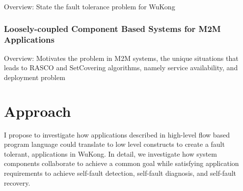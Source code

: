 Overview: State the fault tolerance problem for WuKong

\subsubsection{Loosely-coupled Component Based Systems for M2M Applications}

Overview: Motivates the problem in M2M systems, the unique situations that
leads to RASCO and SetCovering algorithms, namely service availability, and
deployment problem

\begin{comment}
It is a challenge as most embedded systems have
really hard resource constraints and usually deploy in large quantity which
dooms the thought of storing or maintaining any internal states.
Without able to store or maintain states, data replication is infeasible for
systems under this constraints.
\end{comment}

\begin{comment}
The development and deployment for a fault tolerant application is still
immature in most component based middleware. Even though components are modular
in providing reconfigability to applications, they are still not failure resistent
and cannot recover from failures. The problem is worsen when the number of
components increase in applications, the developers would still bear the burden
of manually programming the applications to ensure fault tolerance.
\end{comment}

\begin{comment}
The development and deployment for a fault tolerant application is still
immature in most component based middleware. Even though components are modular
in providing reconfigability to applications, they are still not failure resistent
and cannot recover from failures. The problem is worsen when the number of
components increase in applications, the developers would still bear the burden
of manually programming the applications to ensure fault tolerance.
\end{comment}

\section{Approach}

I propose to investigate how applications described in high-level flow based 
program language could translate to low level constructs to create a
fault tolerant, applications in WuKong. In detail, we investigate how
system components collaborate to achieve a common goal while satisfying
application requirements to achieve self-fault detection, self-fault diagnosis,
and self-fault recovery. 

